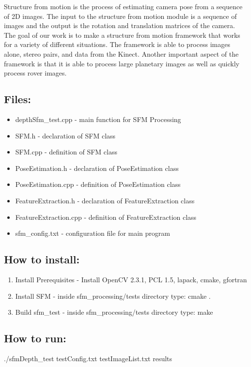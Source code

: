 Structure from motion is the process of estimating camera pose from a sequence of 2D images. The input to the structure from motion module is a sequence of images and the output is the rotation and translation matrices of the camera. The goal of our work is to make a structure from motion framework that works for a variety of different situations. The framework is able to process images alone, stereo pairs, and data from the Kinect. Another important aspect of the framework is that it is able to process large planetary images as well as quickly process rover images.

\subsection{Files:}
\begin{itemize}
	\item{depthSfm\_test.cpp} - main function for SFM Processing
	\item{SFM.h} - declaration of SFM class
	\item{SFM.cpp} - definition of SFM class
	\item{PoseEstimation.h} - declaration of PoseEstimation class
	\item{PoseEstimation.cpp} - definition of PoseEstimation class
	\item{FeatureExtraction.h} - declaration of FeatureExtraction class
	\item{FeatureExtraction.cpp} - definition of FeatureExtraction class
	\item{sfm\_config.txt} - configuration file for main program
\end{itemize}


\subsection{How to install:}
\begin{enumerate}
	\item{Install Prerequisites} - Install OpenCV 2.3.1, PCL 1.5, lapack, cmake, gfortran
	\item{Install SFM} - inside sfm\_processing/tests directory type: cmake .
	\item{Build sfm\_test} - inside sfm\_processing/tests directory type: make
\end{enumerate}

\subsection{How to run:}
./sfmDepth\_test testConfig.txt testImageList.txt results
